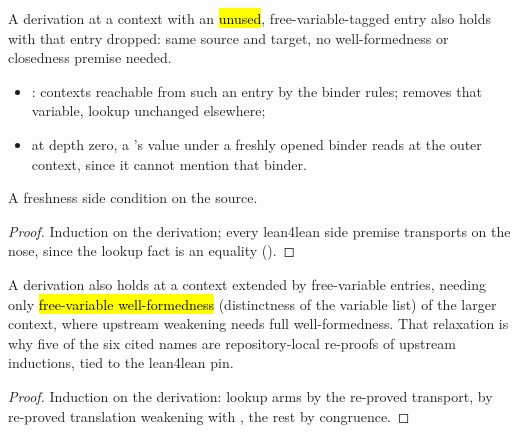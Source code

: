 \begin{lemma}
\label{lem:Erases-thin_vlet}
\leanok
{}
 A derivation at a context with an \hl{unused}, free-variable-tagged  entry also holds with that entry dropped: same source and target, no well-formedness or closedness premise needed.
\begin{itemize}
\item {}: contexts reachable from such an entry by the binder rules; removes that variable, lookup unchanged elsewhere;
\item at depth zero, a 's value under a freshly opened binder reads at the outer context, since it cannot mention that binder.
\end{itemize}
 A freshness side condition on the source.
\end{lemma}
\begin{proof}
\leanok
{}
 Induction on the derivation; every lean4lean side premise transports on the nose, since the lookup fact is an equality ().
\end{proof}

\begin{lemma}
\label{lem:erases_weakFV}
\leanok
{}
 A derivation also holds at a context extended by free-variable entries, needing only \hl{free-variable well-formedness} (distinctness of the variable list) of the larger context, where upstream weakening needs full well-formedness.
 That relaxation is why five of the six cited names are repository-local re-proofs of upstream inductions, tied to the lean4lean pin.
\end{lemma}
\begin{proof}
\leanok
{}
 Induction on the derivation: lookup arms by the re-proved transport,  by re-proved translation weakening with , the rest by congruence.
\end{proof}

